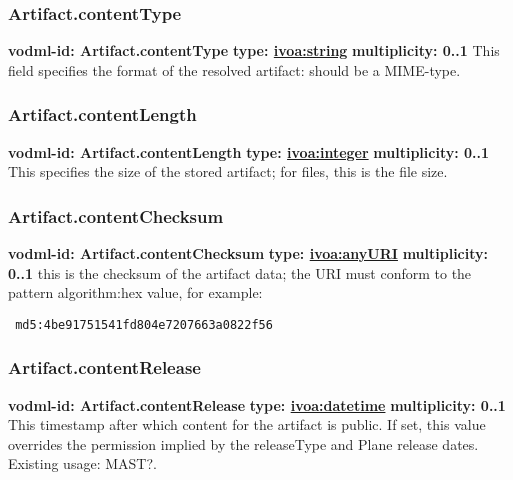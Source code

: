     \subsubsection{Artifact.contentType}
      \textbf{vodml-id: Artifact.contentType} \newline
      \textbf{type: \hyperref[sect:ivoa]{ivoa:string}} \newline
      \textbf{multiplicity: 0..1} \newline
      This field specifies the format of the resolved artifact: should be a MIME-type.

    \subsubsection{Artifact.contentLength}
      \textbf{vodml-id: Artifact.contentLength} \newline
      \textbf{type: \hyperref[sect:ivoa]{ivoa:integer}} \newline
      \textbf{multiplicity: 0..1} \newline
      This specifies the size of the stored artifact; for files, this is the file size.

    \subsubsection{Artifact.contentChecksum}
      \textbf{vodml-id: Artifact.contentChecksum} \newline
      \textbf{type: \hyperref[sect:ivoa]{ivoa:anyURI}} \newline
      \textbf{multiplicity: 0..1} \newline
      this is the checksum of the artifact data; the URI must conform to the pattern {algorithm}:{hex value}, for example: \begin{verbatim} md5:4be91751541fd804e7207663a0822f56 \end{verbatim}

    \subsubsection{Artifact.contentRelease}
      \textbf{vodml-id: Artifact.contentRelease} \newline
      \textbf{type: \hyperref[sect:ivoa]{ivoa:datetime}} \newline
      \textbf{multiplicity: 0..1} \newline
      This timestamp after which content for the artifact is public. If set, this value overrides the permission implied by the releaseType and Plane release dates. Existing usage: MAST?.

